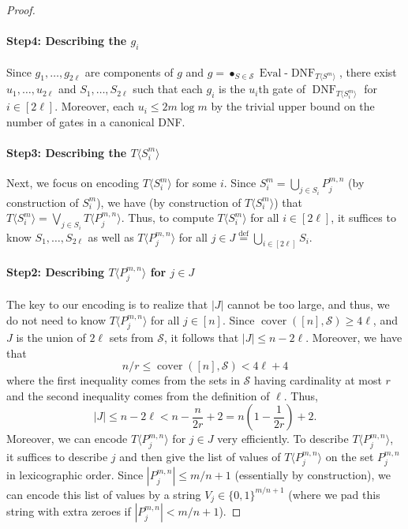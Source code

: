 \begin{proof}
\paragraph{Step4: Describing the $g_i$}
Since $g_1,\ldots,g_{2\ell}$ are components of $g$ and $g=\mathop{\bullet}_{S\in\mathcal S}\operatorname{Eval}\text{-}\operatorname{DNF}_{T\langle S^m\rangle}$, there exist $u_1,\ldots,u_{2\ell}$ and $S_1,\ldots,S_{2\ell}$ such that each $g_i$ is the $u_i$th gate of $\operatorname{DNF}_{T\langle S_i^m\rangle}$ for $i\in[2\ell]$. Moreover, each $u_i\leq2m\log m$ by the trivial upper bound on the number of gates in a canonical DNF.
\paragraph{Step3: Describing the $T\langle S_i^m\rangle$}
Next, we focus on encoding $T\langle S_i^m\rangle$ for some $i$. Since $S_i^m=\bigcup_{j\in S_i}P_j^{m,n}$ (by construction of $S_i^m$), we have (by construction of $T\langle S_i^m\rangle$) that $T\langle S_i^m\rangle=\bigvee_{j\in S_i}T\langle P_j^{m,n}\rangle$. Thus, to compute $T\langle S_i^m\rangle$ for all $i\in[2\ell]$, it suffices to know $S_1,\ldots,S_{2\ell}$ as well as $T\langle P_j^{m,n}\rangle$ for all $j\in J\stackrel{\mathrm{def}}=\bigcup_{i\in[2\ell]}S_i$.
\paragraph{Step2: Describing $T\langle P_j^{m,n}\rangle$ for $j\in J$}
The key to our encoding is to realize that $|J|$ cannot be too large, and thus, we do not need to know $T\langle P_j^{m,n}\rangle$ for all $j\in[n]$. Since $\operatorname{cover}([n],\mathcal S)\geq4\ell$, and $J$ is the union of $2\ell$ sets from $\mathcal S$, it follows that $|J|\leq n-2\ell$. Moreover, we have that
\[n/r\leq\operatorname{cover}([n],\mathcal S)<4\ell+4\]
where the first inequality comes from the sets in $\mathcal S$ having cardinality at most $r$ and the second inequality comes from the definition of $\ell$. Thus,
\[|J|\leq n-2\ell<n-\frac n{2r}+2=n(1-\frac1{2r})+2.\]
Moreover, we can encode $T\langle P_j^{m,n}\rangle$ for $j\in J$ very efficiently. To describe $T\langle P_j^{m,n}\rangle$, it suffices to describe $j$ and then give the list of values of $T\langle P_j^{m,n}\rangle$ on the set $P_j^{m,n}$ in lexicographic order. Since $|P_j^{m,n}|\leq m/n+1$ (essentially by construction), we can encode this list of values by a string $V_j\in\{0,1\}^{m/n+1}$ (where we pad this string with extra zeroes if $|P_j^{m,n}|<m/n+1$).

\end{proof}
